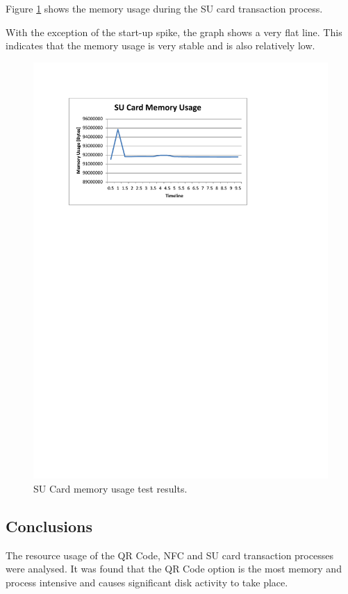 Figure \ref{fig:su_test_mem} shows the memory usage during the SU card transaction
process. 

With the exception of the start-up spike, the graph shows a very flat line. This indicates
that the memory usage is very stable and is also relatively low. 

\begin{figure}
 \centering 
 \includegraphics[clip=true, trim = 0 540 80 70,
 scale=0.7]{su_test_mem}
 \caption{SU Card memory usage test results.}
 \label{fig:su_test_mem}
\end{figure}

\subsection{Conclusions}

The resource usage of the QR Code, NFC and SU card transaction processes were analysed. It
was found that the QR Code option is the most memory and process intensive and causes
significant disk activity to take place. 


